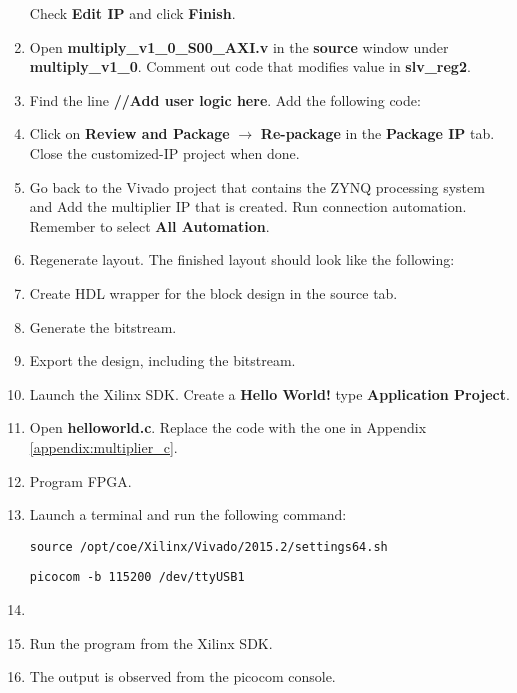 \documentclass[11pt,letterpaper,titlepage]{article}
\begin{document}
\begin{enumerate}
    Check \textbf{Edit IP} and click \textbf{Finish}.
    
    \item Open \textbf{multiply\_v1\_0\_S00\_AXI.v} in the \textbf{source} window under \textbf{multiply\_v1\_0}. Comment out code that modifies value in \textbf{slv\_reg2}.
    
    \item Find the line \textbf{//Add user logic here}. Add the following code:
    
    
    
    \item Click on \textbf{Review and Package} $\rightarrow$ \textbf{Re-package} in the \textbf{Package IP} tab. Close the customized-IP project when done.
    
    \item Go back to the Vivado project that contains the ZYNQ processing system and Add the multiplier IP that is created. Run connection automation. Remember to select \textbf{All Automation}.
    
    \item Regenerate layout. The finished layout should look like the following:
    
    
    \item Create HDL wrapper for the block design in the source tab.
    
    \item Generate the bitstream.
    
    \item Export the design, including the bitstream.
    
    \item Launch the Xilinx SDK. Create a \textbf{Hello World!} type \textbf{Application Project}.
    
    \item Open \textbf{helloworld.c}. Replace the code with the one in Appendix \ref{appendix:multiplier_c}.
    
    \item Program FPGA.
    
    \item Launch a terminal and run the following command:
    
    \verb|source /opt/coe/Xilinx/Vivado/2015.2/settings64.sh|
    
    \verb|picocom -b 115200 /dev/ttyUSB1|
    
    \item
    
    \item Run the program from the Xilinx SDK.
    
    \item The output is observed from the picocom console.
    
\end{enumerate}
\end{document}
